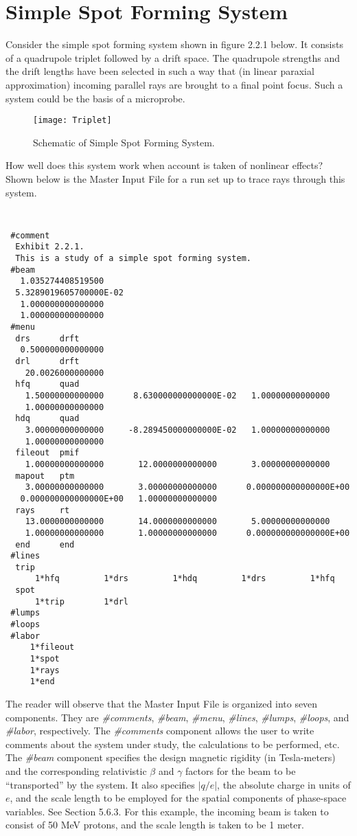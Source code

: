 \section{Simple Spot Forming System}
\label{simplespot}
     Consider the simple spot forming system shown in figure 2.2.1 below.
It consists of a quadrupole triplet followed by a drift space.  The
quadrupole strengths and the drift lengths have been selected in such a way
that (in linear paraxial approximation) incoming parallel rays are brought
to a final point focus.  Such a system could be the basis of a microprobe.


\begin{figure}[htbp]
  \centering
  \texttt{[image: Triplet]}
  \caption{Schematic of Simple Spot Forming System.}
\end{figure}

\pagebreak

   How well does this system work when account is taken of nonlinear
effects? Shown below is the Master Input File for a  run set up
to trace rays through this system.

{\footnotesize\tt
\begin{verbatim}
 #comment
  Exhibit 2.2.1.
  This is a study of a simple spot forming system.
 #beam
   1.035274408519500
  5.3289019605700000E-02
   1.000000000000000
   1.000000000000000
 #menu
  drs      drft
   0.500000000000000
  drl      drft
    20.0026000000000
  hfq      quad
    1.50000000000000      8.630000000000000E-02   1.00000000000000
    1.00000000000000
  hdq      quad
    3.00000000000000     -8.289450000000000E-02   1.00000000000000
    1.00000000000000
  fileout  pmif
    1.00000000000000       12.0000000000000       3.00000000000000
  mapout   ptm
    3.00000000000000       3.00000000000000      0.000000000000000E+00
   0.000000000000000E+00   1.00000000000000
  rays     rt
    13.0000000000000       14.0000000000000       5.00000000000000
    1.00000000000000       1.00000000000000      0.000000000000000E+00
  end      end
 #lines
  trip
      1*hfq         1*drs         1*hdq         1*drs         1*hfq
  spot
      1*trip        1*drl
 #lumps
 #loops
 #labor
     1*fileout
     1*spot
     1*rays
     1*end
\end{verbatim}}

     The reader will observe that the Master Input File is organized into
seven components.  They are {\em \#comments}, {\em \#beam}, {\em \#menu}, {\em \#lines}, {\em \#lumps},
{\em \#loops}, and {\em \#labor}, respectively.  The {\em \#comments} component allows the user
to write comments about the system under study, the calculations to be
performed, etc. The {\em \#beam} component specifies the design magnetic rigidity
(in Tesla-meters) and the corresponding relativistic $\beta$ and $\gamma$ factors for
the beam to be ``transported'' by the system.  It also specifies $|q/e|$,
the absolute charge in units of $e$, and the scale
length to be employed for the spatial components of phase-space
variables.  See Section 5.6.3.
For this example, the incoming beam is taken to consist of 50 MeV protons,
and the scale length is taken to be 1 meter.

